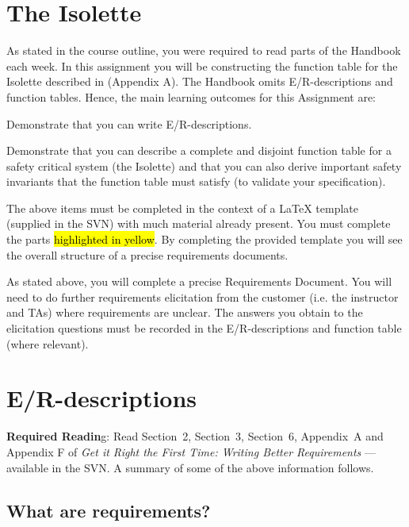 \section{The Isolette}

As stated in the course outline, you were required to read parts of  the Handbook \cite{REMH}  each week. In this assignment you will be constructing the function table for the Isolette described in \cite{REMH} (Appendix A). The Handbook omits E/R-descriptions and function  tables. Hence, the main learning outcomes for this Assignment are:

\begin{mylist}
\item Demonstrate that you can write E/R-descriptions.
\item Demonstrate that you can describe a complete and disjoint function table for a safety critical system (the Isolette) and that you can also derive important safety invariants that the function table must satisfy (to validate your specification).
\item The above items must be completed in the context of a LaTeX template (supplied in the SVN) with much material already present. You must complete the parts \hl{highlighted in yellow}. By completing the provided template you will see the overall structure of a precise requirements documents.
\end{mylist}

\smallskip
\noindent As stated above, you will complete a precise Requirements Document.  You will need to do further requirements elicitation from the customer (i.e. the instructor and TAs) where requirements are unclear. The answers you obtain to the elicitation questions must be recorded in the E/R-descriptions and function table (where relevant).

\section{E/R-descriptions}

\textbf{Required Readin}g: Read Section~2, Section~3, Section~6, Appendix~A and Appendix F of \emph{Get it Right the First Time: Writing Better Requirements} \cite{telelogic}---available in the SVN. A summary of some of the above information follows.

\subsection{What are requirements?}

